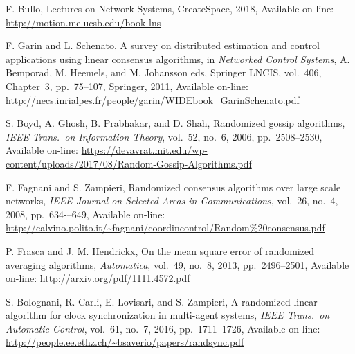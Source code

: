 \documentclass[oneside]{article}
\begin{document}
\begin{thebibliography}{6}

\small

F. Bullo, Lectures on Network Systems, CreateSpace, 2018, Available on-line: \url{http://motion.me.ucsb.edu/book-lns}

F. Garin and L. Schenato, A survey on distributed estimation and control applications using linear consensus algorithms, in {\it Networked Control Systems}, A. Bemporad, M. Heemels, and M. Johansson eds, Springer LNCIS, vol.~406, Chapter~3, pp.~75--107, Springer, 2011, Available on-line: \url{http://necs.inrialpes.fr/people/garin/WIDEbook_GarinSchenato.pdf}


S. Boyd, A. Ghosh, B. Prabhakar, and D. Shah, Randomized gossip algorithms, {\it IEEE Trans.\ on Information Theory}, vol.~52, no.~6, 2006, pp.~2508--2530, Available on-line: \url{https://devavrat.mit.edu/wp-content/uploads/2017/08/Random-Gossip-Algorithms.pdf}


F. Fagnani and S. Zampieri, Randomized consensus algorithms over large scale networks,
{\it IEEE Journal on Selected Areas in Communications}, vol.~26, no.~4, 2008, pp.~634-–649, Available on-line:
\url{http://calvino.polito.it/~fagnani/coordincontrol/Random%20consensus.pdf}

P. Frasca and J. M. Hendrickx, On the mean square error of randomized averaging algorithms, {\it Automatica}, vol.~49, no.~8, 2013, pp.~2496--2501, Available on-line: \url{http://arxiv.org/pdf/1111.4572.pdf}

S. Bolognani, R. Carli, E. Lovisari, and S. Zampieri,
A randomized linear algorithm for clock synchronization in multi-agent systems,
{\it IEEE Trans.\ on Automatic Control}, vol.~61, no.~7, 2016, pp.~1711--1726, Available on-line:
\url{http://people.ee.ethz.ch/~bsaverio/papers/randsync.pdf}


\end{thebibliography}
\end{document}
